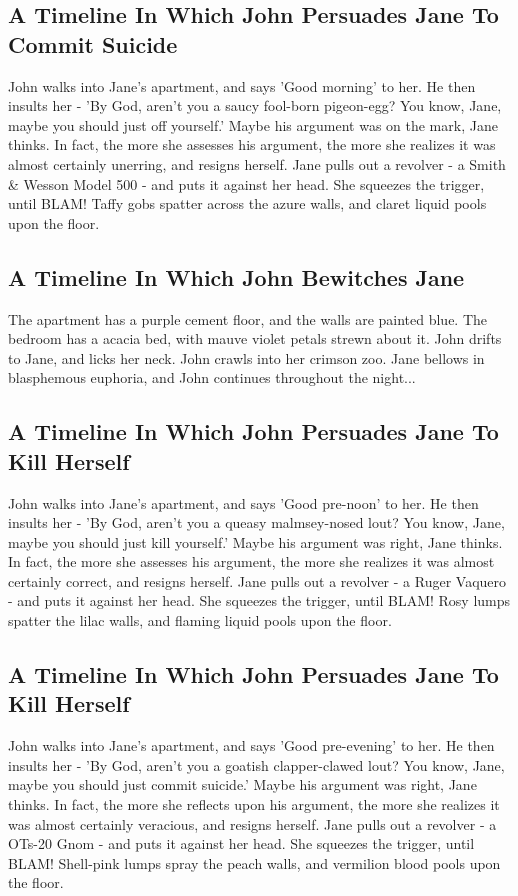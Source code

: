 \documentclass{article}
\begin{document}
\subsection{A Timeline In Which John Persuades Jane To Commit Suicide}


John walks into Jane's apartment, and says 'Good morning' to her.
He then insults her {-} 'By God, aren't you a saucy fool{-}born pigeon{-}egg?
You know, Jane, maybe you should just off yourself.'
Maybe his argument was on the mark, Jane thinks.
In fact, the more she assesses his argument, the more she realizes it was almost certainly unerring, and resigns herself.
Jane pulls out a revolver {-} a Smith \& Wesson Model 500 {-} and puts it against her head.
She squeezes the trigger, until BLAM!
Taffy gobs spatter across the azure walls, and claret liquid pools upon the floor.
\subsection{A Timeline In Which John Bewitches Jane}


The apartment has a purple cement floor, and the walls are painted blue.
The bedroom has a acacia bed, with mauve violet petals strewn about it.
John drifts to Jane, and licks her neck.
John crawls into her crimson zoo.
Jane bellows in blasphemous euphoria, and John continues throughout the night...
\subsection{A Timeline In Which John Persuades Jane To Kill Herself}


John walks into Jane's apartment, and says 'Good pre{-}noon' to her.
He then insults her {-} 'By God, aren't you a queasy malmsey{-}nosed lout?
You know, Jane, maybe you should just kill yourself.'
Maybe his argument was right, Jane thinks.
In fact, the more she assesses his argument, the more she realizes it was almost certainly correct, and resigns herself.
Jane pulls out a revolver {-} a Ruger Vaquero {-} and puts it against her head.
She squeezes the trigger, until BLAM!
Rosy lumps spatter the lilac walls, and flaming liquid pools upon the floor.
\subsection{A Timeline In Which John Persuades Jane To Kill Herself}


John walks into Jane's apartment, and says 'Good pre{-}evening' to her.
He then insults her {-} 'By God, aren't you a goatish clapper{-}clawed lout?
You know, Jane, maybe you should just commit suicide.'
Maybe his argument was right, Jane thinks.
In fact, the more she reflects upon his argument, the more she realizes it was almost certainly veracious, and resigns herself.
Jane pulls out a revolver {-} a OTs{-}20 Gnom {-} and puts it against her head.
She squeezes the trigger, until BLAM!
Shell{-}pink lumps spray the peach walls, and vermilion blood pools upon the floor.
\end{document}
